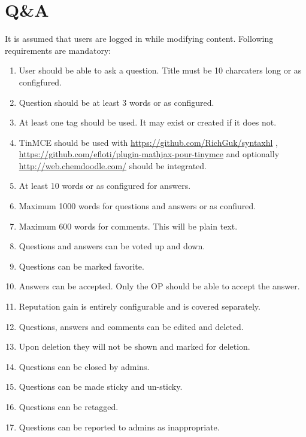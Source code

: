 \documentclass[letterpaper,10pt,english]{sphinxmanual}
\begin{document}
\section{Q\&A}
\label{req:q-a}
It is assumed that users are logged in while modifying content.
Following requirements are mandatory:
\begin{enumerate}
\item {} 
User should be able to ask a question. Title must be 10 charcaters long or
as configfured.

\item {} 
Question should be at least 3 words or as configured.

\item {} 
At least one tag should be used. It may exist or created if it does not.

\item {} 
TinMCE should be used with \href{https://github.com/RichGuk/syntaxhl}{https://github.com/RichGuk/syntaxhl} ,
\href{https://github.com/efloti/plugin-mathjax-pour-tinymce}{https://github.com/efloti/plugin-mathjax-pour-tinymce} and optionally
\href{http://web.chemdoodle.com/}{http://web.chemdoodle.com/} should be integrated.

\item {} 
At least 10 words or as configured for answers.

\item {} 
Maximum 1000 words for questions and answers or as confiured.

\item {} 
Maximum 600 words for comments. This will be plain text.

\item {} 
Questions and answers can be voted up and down.

\item {} 
Questions can be marked favorite.

\item {} 
Answers can be accepted. Only the OP should be able to accept the answer.

\item {} 
Reputation gain is entirely configurable and is covered separately.

\item {} 
Questions, answers and comments can be edited and deleted.

\item {} 
Upon deletion they will not be shown and marked for deletion.

\item {} 
Questions can be closed by admins.

\item {} 
Questions can be made sticky and un-sticky.

\item {} 
Questions can be retagged.

\item {} 
Questions can be reported to admins as inappropriate.

\end{enumerate}
\end{document}
